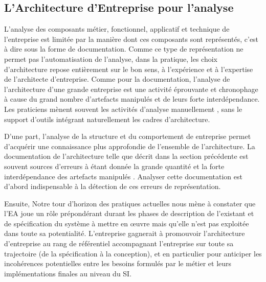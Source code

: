 	\subsection{L'Architecture d'Entreprise pour l'analyse}
	
	L'analyse des composants métier, fonctionnel, applicatif et technique de 
l'entreprise est limitée par la manière dont ces composants sont représentés, 
c'est à dire sous la forme de documentation. Comme ce type de représentation ne 
permet pas l'automatisation de l'analyse, dans la pratique, les choix 
d'architecture repose entièrement sur le bon sens, à l'expérience et à 
l'expertise de l'architecte d'entreprise. Comme pour la documentation, l'analyse 
de l'architecture d'une grande entreprise est une activité éprouvante et 
chronophage à cause du grand nombre d'artefacts manipulés et de leurs forte 
interdépendance. Les praticiens mènent souvent les activités d'analyse 
manuellement \cite{barn2013enterprise}, sans le support d'outils intégrant 
naturellement les cadres d'architecture.
	
	D'une part, l'analyse de la structure et du comportement de entreprise permet 
d'acquérir une connaissance plus approfondie de l'ensemble de l'architecture. La 
documentation de l'architecture telle que décrit dans la section précédente est 
souvent sources d'erreurs à étant donnée la grande quantité et la forte 
interdépendance des artefacts manipulés \cite{kaisler_enterprise_2005}. Analyser 
cette documentation est d'abord indispensable à la détection de ces erreurs de 
représentation.
	
	Ensuite, Notre tour d'horizon des pratiques actuelles nous mène à constater que 
l'EA joue un rôle prépondérant durant les phases de description de l'existant et 
de spécification du système à mettre en œuvre mais qu'elle n'est pas exploitée 
dans toute sa potentialité. L'entreprise gagnerait à promouvoir l'architecture 
d'entreprise au rang de référentiel accompagnant l'entreprise sur toute sa 
trajectoire (de la spécification à la conception), et en particulier pour 
anticiper les incohérences potentielles entre les besoins formulés par le métier 
et leurs implémentations finales au niveau du SI.
	

